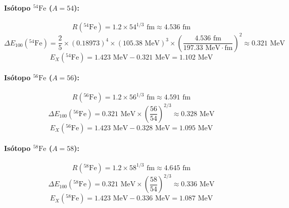 \begin{problema}
\paragraph{Isótopo ${}^{54}\text{Fe}$ ($A = 54$):}
\begin{equation*}
R({}^{54}\text{Fe}) = 1.2 \times 54^{1/3}\text{ fm} \approx 4.536\text{ fm}
\end{equation*}
\begin{equation*}
\Delta E_{100}({}^{54}\text{Fe}) = \frac{2}{5} \times (0.18973)^4 \times (105.38\text{ MeV})^3 \times \left( \frac{4.536\text{ fm}}{197.33\text{ MeV}\cdot\text{fm}} \right)^2 \approx 0.321\text{ MeV}
\end{equation*}
\begin{equation*}
E_X({}^{54}\text{Fe}) = 1.423\text{ MeV} - 0.321\text{ MeV} = 1.102\text{ MeV}
\end{equation*}

\paragraph{Isótopo ${}^{56}\text{Fe}$ ($A = 56$):}
\begin{equation*}
R({}^{56}\text{Fe}) = 1.2 \times 56^{1/3}\text{ fm} \approx 4.591\text{ fm}
\end{equation*}
\begin{equation*}
\Delta E_{100}({}^{56}\text{Fe}) = 0.321\text{ MeV} \times \left( \frac{56}{54} \right)^{2/3} \approx 0.328\text{ MeV}
\end{equation*}
\begin{equation*}
E_X({}^{56}\text{Fe}) = 1.423\text{ MeV} - 0.328\text{ MeV} = 1.095\text{ MeV}
\end{equation*}

\paragraph{Isótopo ${}^{58}\text{Fe}$ ($A = 58$):}
\begin{equation*}
R({}^{58}\text{Fe}) = 1.2 \times 58^{1/3}\text{ fm} \approx 4.645\text{ fm}
\end{equation*}
\begin{equation*}
\Delta E_{100}({}^{58}\text{Fe}) = 0.321\text{ MeV} \times \left( \frac{58}{54} \right)^{2/3} \approx 0.336\text{ MeV}
\end{equation*}
\begin{equation*}
E_X({}^{58}\text{Fe}) = 1.423\text{ MeV} - 0.336\text{ MeV} = 1.087\text{ MeV}
\end{equation*}


\end{problema}
